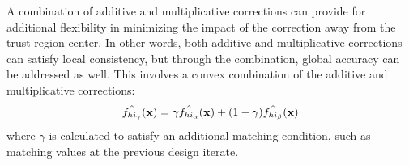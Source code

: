 A combination of additive and multiplicative corrections can provide
for additional flexibility in minimizing the impact of the correction
away from the trust region center.  In other words, both additive and
multiplicative corrections can satisfy local consistency, but through
the combination, global accuracy can be addressed as well.  This
involves a convex combination of the additive and multiplicative
corrections:
\begin{equation}
\hat{f_{hi_{\gamma}}}({\bf x}) = \gamma \hat{f_{hi_{\alpha}}}({\bf x}) +
(1 - \gamma) \hat{f_{hi_{\beta}}}({\bf x}) \label{eq:combined_form}
\end{equation}
where $\gamma$ is calculated to satisfy an additional matching
condition, such as matching values at the previous design iterate.


%
%
%

